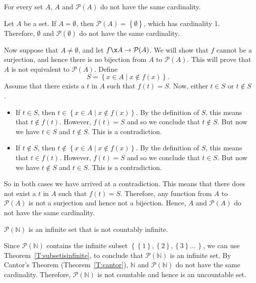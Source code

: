 \begin{theorem}\label{T:cantor}
For every set $A$, $A$ and $\mathcal{P} ( A )$ do not have the same cardinality.
\end{theorem}
%
\begin{myproof}
Let $A$ be a set.  If $A = \emptyset$, then 
$\mathcal{P} ( A ) = \left\{ \emptyset \right\}$, which has cardinality 1.  Therefore, 
$\emptyset$ and $\mathcal{P} ( \emptyset )$ do not have the same cardinality.

Now suppose that $A \ne \emptyset$, and let $f\x  A \to \mathcal{P} ( A )$.  We will show that $f$ cannot be a surjection, and hence there is no bijection from $A$ to 
$\mathcal{P} ( A )$.  This will prove that $A$ is not equivalent to 
$\mathcal{P} ( A )$.  Define
\[
S = \left\{ x \in A \mid x \notin f ( x ) \right\}.
\]
Assume that there exists a $t$ in $A$ such that $f ( t ) = S$.  Now, either $t \in S$ or $t \notin S$.

\begin{itemize}
\item If $t \in S$, then $t \in \left\{ x \in A \mid x \notin f ( x ) \right\}$.  By the definition of $S$, this means that $t \notin f ( t )$.  However, 
$f ( t ) = S$ and so we conclude that $t \notin S$.  But now we have $t \in S$ and $t \notin S$.  This is a contradiction.

\item If $t \notin S$, then $t \notin \left\{ x \in A \mid x \notin f ( x ) \right\}$.  By the definition of $S$, this means that $t \in f ( t )$.  However, 
$f ( t ) = S$ and so we conclude that $t \in S$.  But now we have $t \notin S$ and $t \in S$.  This is a contradiction.
\end{itemize}
So in both cases we have arrived at a contradiction.  This means that there does not exist a 
$t$ in $A$ such that $f ( t ) = S$.  Therefore, any function from $A$ to 
$\mathcal{P} ( A )$ is not a surjection and hence not a bijection.  Hence, $A$ and 
$\mathcal{P} ( A )$ do not have the same cardinality. 
\end{myproof}
%
\begin{corollary}\label{C:cantor}
$\mathcal{P} ( \mathbb{N} )$ is an infinite set that is not countably infinite.
\end{corollary}
%
\begin{myproof}
Since $\mathcal{P} ( \mathbb{N} )$ contains the infinite subset 
$\left\{ \left\{ 1 \right\}, \left\{ 2 \right\}, \left\{ 3 \right\} \ldots \,\right\}$, we can use 
Theorem~\ref{T:subsetisinfinite}, to conclude that $\mathcal{P} ( \mathbb{N} )$ is an infinite set.  By Cantor's Theorem (Theorem~\ref{T:cantor}), $\mathbb{N}$ and 
$\mathcal{P} ( \mathbb{N} )$ do not have the same cardinality.  Therefore, 
$\mathcal{P} ( \mathbb{N} )$ is not countable and hence is an uncountable set.
\end{myproof}
%
